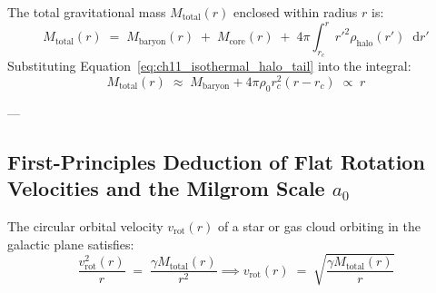\documentclass[
    12pt,
    a4paper,
    headings=normal,
    twoside=false,
    open=any,
    parskip=half
]{scrbook}
\newcommand{\diff}{\mathop{}\!\mathrm{d}}
\begin{document}
The total gravitational mass $M_{\text{total}}(r)$ enclosed within radius $r$ is:
\begin{equation}
M_{\text{total}}(r) \;=\; M_{\text{baryon}}(r) \;+\; M_{\text{core}}(r) \;+\; 4\pi \int_{r_c}^r r'^2 \rho_{\text{halo}}(r') \diff r'
\end{equation}
Substituting Equation~\eqref{eq:ch11_isothermal_halo_tail} into the integral:
\begin{equation}
M_{\text{total}}(r) \;\approx\; M_{\text{baryon}} + 4\pi \rho_0 r_c^2 \left( r - r_c \right) \;\propto\; r
\end{equation}

---

\subsection{First-Principles Deduction of Flat Rotation Velocities and the Milgrom Scale $a_0$}

The circular orbital velocity $v_{\text{rot}}(r)$ of a star or gas cloud orbiting in the galactic plane satisfies:
\begin{equation}
\frac{v_{\text{rot}}^2(r)}{r} \;=\; \frac{\gamma M_{\text{total}}(r)}{r^2} \implies v_{\text{rot}}(r) \;=\; \sqrt{\frac{\gamma M_{\text{total}}(r)}{r}}
\label{eq:ch11_orbital_velocity_definition}
\end{equation}
\end{document}

